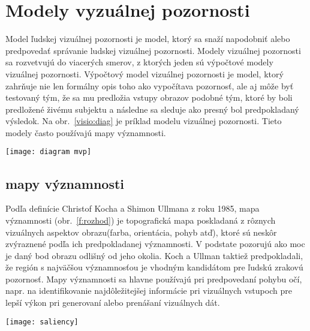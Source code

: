 \documentclass[10pt,twoside,slovak,a4paper]{article}
\begin{document}
\section{Modely vyzuálnej pozornosti} \label{1modely}
Model ľudskej vizuálnej pozornosti je model, ktorý sa snaží napodobniť alebo predpovedať správanie ludskej vizuálnej pozornosti. Modely vizuálnej pozornosti sa rozvetvujú do viacerých smerov, z ktorých jeden sú výpočtové modely vizuálnej pozornosti. Výpočtový model vizuálnej pozornosti je model, ktorý zahrňuje nie len formálny opis toho ako vypočítava pozornosť, ale aj môže byť testovaný tým, že sa mu predložia vstupy obrazov podobné tým, ktoré by boli predložené živému subjektu a následne sa sleduje ako presný bol predpokladaný výsledok. Na obr.~\ref{visio:diag} je príklad modelu vizuálnej pozornosti. Tieto modely často používajú mapy významnosti.
\begin{figure*}[tbh]
\centering
\texttt{[image: diagram mvp]}
\caption{príklad modelu vizuálnej pozornosti, ktorý napodobňuje reakciu ľudského zraku na vizuálny podnet.}
\label{visio:diag}
\end{figure*}
\subsection{mapy významnosti} \label{ina:nejake}
Podľa definície Christof Kocha a Shimon Ullmana z roku 1985, mapa významnosti (obr.~\ref{f:rozhod}) je topografická mapa poskladaná z rôznych vizuálnych aspektov obrazu(farba, orientácia, pohyb atď), ktoré sú neskôr zvýraznené podľa ich predpokladanej významnosti. V podstate pozorujú ako moc je daný bod obrazu odlišný od jeho okolia. Koch a Ullman taktiež predpokladali, že región s najväčšou významnosťou je vhodným kandidátom pre ľudskú zrakovú pozornosť. Mapy významnosti sa hlavne používajú pri predpovedaní pohybu očí, napr. na identifikovanie najdôležitejšej informácie pri vizuálnych vstupoch pre lepší výkon pri generovaní alebo prenášaní vizuálnych dát.
\begin{figure*}[tbh]
\centering
\texttt{[image: saliency]}
\caption{Príklad mapy významnosti. Napravo je je vizuálny obraz a naľavo je jeho mapa významnosti.}
\label{f:rozhod}
\end{figure*}
\end{document}
